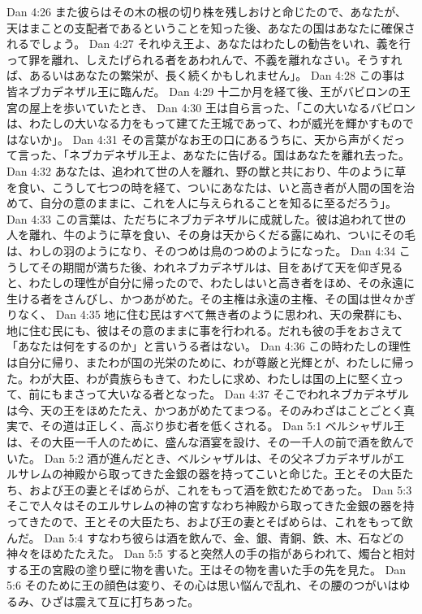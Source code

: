 Dan 4:26  また彼らはその木の根の切り株を残しおけと命じたので、あなたが、天はまことの支配者であるということを知った後、あなたの国はあなたに確保されるでしょう。
Dan 4:27  それゆえ王よ、あなたはわたしの勧告をいれ、義を行って罪を離れ、しえたげられる者をあわれんで、不義を離れなさい。そうすれば、あるいはあなたの繁栄が、長く続くかもしれません」。
Dan 4:28  この事は皆ネブカデネザル王に臨んだ。
Dan 4:29  十二か月を経て後、王がバビロンの王宮の屋上を歩いていたとき、
Dan 4:30  王は自ら言った、「この大いなるバビロンは、わたしの大いなる力をもって建てた王城であって、わが威光を輝かすものではないか」。
Dan 4:31  その言葉がなお王の口にあるうちに、天から声がくだって言った、「ネブカデネザル王よ、あなたに告げる。国はあなたを離れ去った。
Dan 4:32  あなたは、追われて世の人を離れ、野の獣と共におり、牛のように草を食い、こうして七つの時を経て、ついにあなたは、いと高き者が人間の国を治めて、自分の意のままに、これを人に与えられることを知るに至るだろう」。
Dan 4:33  この言葉は、ただちにネブカデネザルに成就した。彼は追われて世の人を離れ、牛のように草を食い、その身は天からくだる露にぬれ、ついにその毛は、わしの羽のようになり、そのつめは鳥のつめのようになった。
Dan 4:34  こうしてその期間が満ちた後、われネブカデネザルは、目をあげて天を仰ぎ見ると、わたしの理性が自分に帰ったので、わたしはいと高き者をほめ、その永遠に生ける者をさんびし、かつあがめた。その主権は永遠の主権、その国は世々かぎりなく、
Dan 4:35  地に住む民はすべて無き者のように思われ、天の衆群にも、地に住む民にも、彼はその意のままに事を行われる。だれも彼の手をおさえて「あなたは何をするのか」と言いうる者はない。
Dan 4:36  この時わたしの理性は自分に帰り、またわが国の光栄のために、わが尊厳と光輝とが、わたしに帰った。わが大臣、わが貴族らもきて、わたしに求め、わたしは国の上に堅く立って、前にもまさって大いなる者となった。
Dan 4:37  そこでわれネブカデネザルは今、天の王をほめたたえ、かつあがめたてまつる。そのみわざはことごとく真実で、その道は正しく、高ぶり歩む者を低くされる。
Dan 5:1  ベルシャザル王は、その大臣一千人のために、盛んな酒宴を設け、その一千人の前で酒を飲んでいた。
Dan 5:2  酒が進んだとき、ベルシャザルは、その父ネブカデネザルがエルサレムの神殿から取ってきた金銀の器を持ってこいと命じた。王とその大臣たち、および王の妻とそばめらが、これをもって酒を飲むためであった。
Dan 5:3  そこで人々はそのエルサレムの神の宮すなわち神殿から取ってきた金銀の器を持ってきたので、王とその大臣たち、および王の妻とそばめらは、これをもって飲んだ。
Dan 5:4  すなわち彼らは酒を飲んで、金、銀、青銅、鉄、木、石などの神々をほめたたえた。
Dan 5:5  すると突然人の手の指があらわれて、燭台と相対する王の宮殿の塗り壁に物を書いた。王はその物を書いた手の先を見た。
Dan 5:6  そのために王の顔色は変り、その心は思い悩んで乱れ、その腰のつがいはゆるみ、ひざは震えて互に打ちあった。
